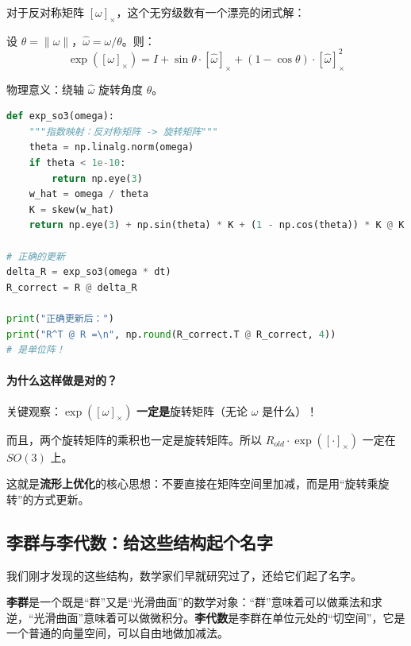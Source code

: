 对于反对称矩阵 $[\omega]_\times$，这个无穷级数有一个漂亮的闭式解：

\begin{keytheorem}[title=罗德里格斯公式（Rodrigues' Formula）]
设 $\theta = \|\omega\|$，$\hat{\omega} = \omega / \theta$。则：
\begin{equation}
\exp([\omega]_\times) = I + \sin\theta \cdot [\hat{\omega}]_\times + (1 - \cos\theta) \cdot [\hat{\omega}]_\times^2
\end{equation}

物理意义：绕轴 $\hat{\omega}$ 旋转角度 $\theta$。
\end{keytheorem}

\begin{lstlisting}[style=teaching, language=Python]
def exp_so3(omega):
    """指数映射：反对称矩阵 -> 旋转矩阵"""
    theta = np.linalg.norm(omega)
    if theta < 1e-10:
        return np.eye(3)
    w_hat = omega / theta
    K = skew(w_hat)
    return np.eye(3) + np.sin(theta) * K + (1 - np.cos(theta)) * K @ K

# 正确的更新
delta_R = exp_so3(omega * dt)
R_correct = R @ delta_R

print("正确更新后：")
print("R^T @ R =\n", np.round(R_correct.T @ R_correct, 4))
# 是单位阵！
\end{lstlisting}

\paragraph{为什么这样做是对的？}

关键观察：$\exp([\omega]_\times)$ \textbf{一定是}旋转矩阵（无论 $\omega$ 是什么）！

而且，两个旋转矩阵的乘积也一定是旋转矩阵。所以 $R_{old} \cdot \exp([\cdot]_\times)$ 一定在 $SO(3)$ 上。

这就是\textbf{流形上优化}的核心思想：不要直接在矩阵空间里加减，而是用“旋转乘旋转”的方式更新。

\subsection*{李群与李代数：给这些结构起个名字}

我们刚才发现的这些结构，数学家们早就研究过了，还给它们起了名字。

\begin{definition}
\textbf{李群}是一个既是“群”又是“光滑曲面”的数学对象：“群”意味着可以做乘法和求逆，“光滑曲面”意味着可以做微积分。\textbf{李代数}是李群在单位元处的“切空间”，它是一个普通的向量空间，可以自由地做加减法。
\end{definition}


